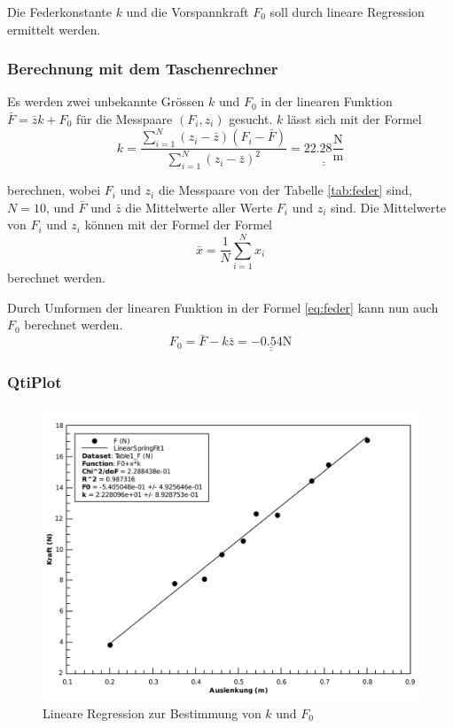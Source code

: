 Die Federkonstante $k$ und die Vorspannkraft $F_0$ soll durch lineare Regression ermittelt werden.


\subsubsection*{Berechnung mit dem Taschenrechner}

Es werden zwei unbekannte Gr\"ossen $k$ und $F_0$ in der linearen Funktion $\bar{F}=\bar{z}k+F_0$
f\"ur die Messpaare $(F_i, z_i)$ gesucht. $k$ l\"asst sich mit der Formel
\begin{equation}
    k = \frac{ \sum_{i=1}^{N} (z_i - \bar{z}) (F_i - \bar{F})}{ \sum_{i=1}^{N} (z_i - \bar{z})^2} = \underline{\underline{22.28 \frac{\textrm{N}}{\textrm{m}}}}
    \label{eq:k}
\end{equation}

berechnen, wobei $F_i$ und $z_i$ die Messpaare von der Tabelle \ref{tab:feder} sind, $N=10$, und
$\bar{F}$ und $\bar{z}$ die Mittelwerte aller Werte $F_i$ und $z_i$ sind. Die Mittelwerte von
$F_i$ und $z_i$ k\"onnen mit der Formel
der Formel
\begin{equation}
    \bar{x} = \frac{1}{N} \sum_{i=1}^{N} x_i
    \label{eq:mittelwert}
\end{equation}
berechnet werden.

Durch Umformen der linearen Funktion in der Formel \ref{eq:feder} kann nun auch $F_0$ berechnet
werden.
\begin{equation}
    F_0 = \bar{F} - k\bar{z} = \underline{\underline{-0.54 \textrm{N}}}
\end{equation}


\subsubsection*{QtiPlot}

\begin{figure}[H]
    \center
    \includegraphics[width=.8\textwidth]{qtiplot/feder-linear}
    \caption{Lineare Regression zur Bestimmung von $k$ und $F_0$}
    \label{fig:feder-linear}
\end{figure}

